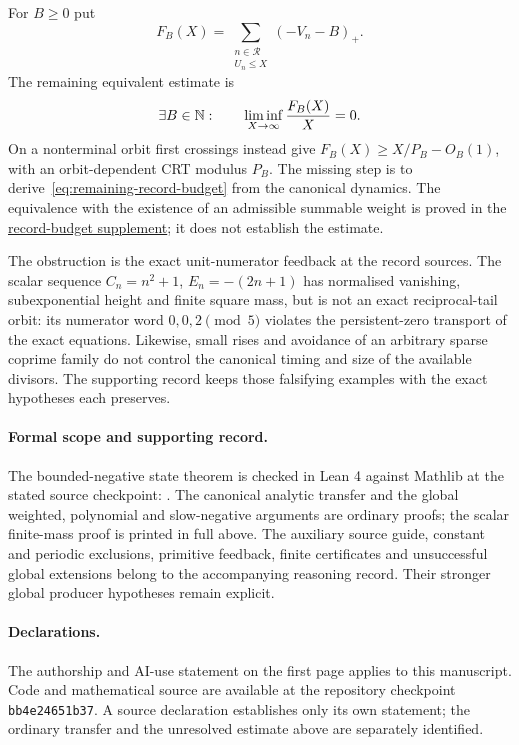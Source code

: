 \documentclass[11pt]{article}
\renewcommand{\commitshort}{bb4e24651b37}
\begin{document}
For $B\ge0$ put
\[
 F_B(X)=\sum_{\substack{n\in\mathcal R\\U_n\le X}}(-V_n-B)_+.
\]
The remaining equivalent estimate is
\begin{equation}\label{eq:remaining-record-budget}
 \exists B\in\N:\qquad\liminf_{X\to\infty}\frac{F_B(X)}X=0.
\end{equation}
On a nonterminal orbit first crossings instead give
$F_B(X)\ge X/P_B-O_B(1)$, with an orbit-dependent CRT modulus $P_B$.
The missing step is to derive~\eqref{eq:remaining-record-budget} from
the canonical dynamics. The equivalence with the existence of an
admissible summable weight is proved in the
\href{\repobase/\PX/Erdos243/LcmDefectCriterionReduction.md}
{record-budget supplement}; it does not establish the estimate.

The obstruction is the exact unit-numerator feedback at the record sources.
The scalar sequence $C_n=n^2+1$, $E_n=-(2n+1)$ has normalised vanishing,
subexponential height and finite square mass, but is not an exact
reciprocal-tail orbit: its numerator word $0,0,2\pmod5$ violates the
persistent-zero transport of the exact equations. Likewise, small rises
and avoidance of an arbitrary sparse coprime family do not control the
canonical timing and size of the available divisors. The supporting record
keeps those falsifying examples with the exact hypotheses each preserves.

\paragraph{Formal scope and supporting record.}
The bounded-negative state theorem is checked in Lean 4 against Mathlib
at the stated source checkpoint:
.
The canonical analytic transfer and the global weighted, polynomial and
slow-negative arguments are ordinary proofs; the scalar finite-mass proof
is printed in full above. The auxiliary source guide, constant and periodic
exclusions, primitive feedback, finite certificates and unsuccessful global
extensions belong to the accompanying reasoning record. Their stronger
global producer hypotheses remain explicit.

\paragraph{Declarations.}
The authorship and AI-use statement on the first page applies to this
manuscript. Code and mathematical source are available at the repository
checkpoint \texttt{\commitshort}. A source declaration establishes only
its own statement; the ordinary transfer and the unresolved estimate above
are separately identified.
\end{document}
